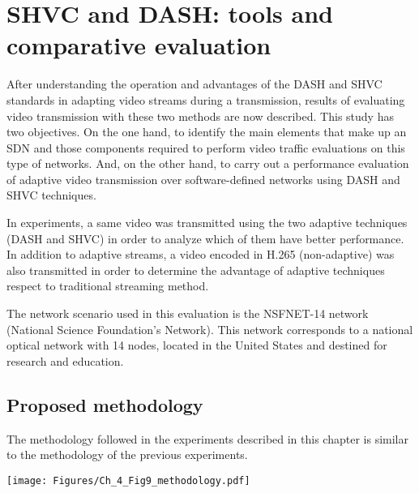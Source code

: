 
\section{SHVC and DASH: tools and comparative evaluation}
\label{sec:4.5}
After understanding the operation and advantages of the DASH and SHVC standards in adapting video streams during a transmission, results of evaluating video transmission with these two methods are now described. This study has two objectives. On the one hand, to identify the main elements that make up an SDN and those components required to perform video traffic evaluations on this type of networks. And, on the other hand, to carry out a performance evaluation of adaptive video transmission over software-defined networks using DASH and SHVC techniques.

In experiments, a same video was transmitted using the two adaptive techniques (DASH and SHVC) in order to analyze which of them have better performance. In addition to adaptive streams, a video encoded in H.265 (non-adaptive) was also transmitted in order to determine the advantage of adaptive techniques respect to traditional streaming method.

The network scenario used in this evaluation is the NSFNET-14 network (National Science Foundation's Network). This network corresponds to a national optical network with 14 nodes, located in the United States and destined for research and education.

\subsection{Proposed methodology}
\label{subsec:4.5.1}
The methodology followed in the experiments described in this chapter is similar to the methodology of the previous experiments. 

\begin{center}
\texttt{[image: Figures/Ch\_4\_Fig9\_methodology.pdf]}
\label{ch4_fig:9}       %
\end{center}


